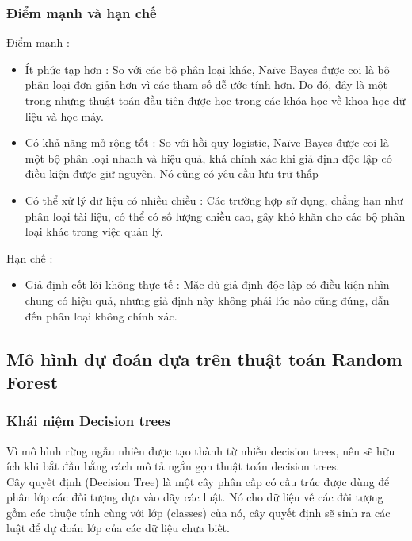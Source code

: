 \begin{enumerate}
\subsubsection{Điểm mạnh và hạn chế}
Điểm mạnh : 
\begin{itemize}
    \item Ít phức tạp hơn : So với các bộ phân loại khác, Naïve Bayes được coi là bộ phân loại đơn giản hơn vì các tham số dễ ước tính hơn. Do đó, đây là một trong những thuật toán đầu tiên được học trong các khóa học về khoa học dữ liệu và học máy.
    \item Có khả năng mở rộng tốt : So với hồi quy logistic, Naïve Bayes được coi là một bộ phân loại nhanh và hiệu quả, khá chính xác khi giả định độc lập có điều kiện được giữ nguyên. Nó cũng có yêu cầu lưu trữ thấp
    \item Có thể xử lý dữ liệu có nhiều chiều : Các trường hợp sử dụng, chẳng hạn như phân loại tài liệu, có thể có số lượng chiều cao, gây khó khăn cho các bộ phân loại khác trong việc quản lý.
\end{itemize}
Hạn chế : 
\begin{itemize}
    \item Giả định cốt lõi không thực tế : Mặc dù giả định độc lập có điều kiện nhìn chung có hiệu quả, nhưng giả định này không phải lúc nào cũng đúng, dẫn đến phân loại không chính xác.
\end{itemize}
\subsection{Mô hình dự đoán dựa trên thuật toán Random Forest}
\subsubsection{Khái niệm Decision trees}
Vì mô hình rừng ngẫu nhiên được tạo thành từ nhiều decision trees, nên sẽ hữu ích khi bắt đầu bằng cách mô tả ngắn gọn thuật toán decision trees.
\\Cây quyết định (Decision Tree) là một cây phân cấp có cấu trúc được dùng để phân lớp các đối tượng dựa vào dãy các luật. Nó cho dữ liệu về các đối tượng gồm các thuộc
tính cùng với lớp (classes) của nó, cây quyết định sẽ sinh ra các luật để dự đoán lớp của các dữ liệu chưa biết. 

\end{enumerate}
